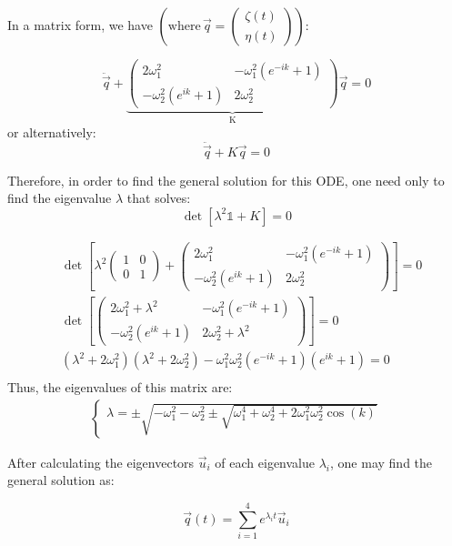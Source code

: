 \documentclass[
course = {{ITVO}},
quartile = {{1}},
assignment = 6,
name = {{Samir Salmen}},
studentnumber = {{NUSP: 11298636}},
email = {{samir.salmen@usp.br}},
firstexercise = 1
]{aga-homework}
\begin{document}
			In a matrix form, we have $\left(\text{where} \, \vec{q} = \begin{pmatrix}\zeta(t)\\\eta(t)\end{pmatrix}\right)$:
			
			\begin{equation}
				\ddot{\vec{q}} + \underbrace{\begin{pmatrix}2\omega_1^2 & -\omega_1^2(e^{-ik} + 1)\\ -\omega_2^2(e^{ik} + 1) & 2\omega_2^2\end{pmatrix}}_\text{K}\vec{q} = 0
			\end{equation}
			or alternatively:
			\begin{equation}
				\ddot{\vec{q}} + K\vec{q} = 0
			\end{equation}
			
			Therefore, in order to find the general solution for this ODE, one need only to find the eigenvalue $\lambda$ that solves:
			\begin{equation}
				\det[\lambda^2\mathds{1} + K] = 0
			\end{equation}
				
			\begin{align}
				&\det\left[\lambda^2 \begin{pmatrix}1 & 0\\ 0 & 1\end{pmatrix}+ \begin{pmatrix}2\omega_1^2 & -\omega_1^2(e^{-ik} + 1)\\ -\omega_2^2(e^{ik} + 1) & 2\omega_2^2\end{pmatrix} \right] = 0\\
				&\det\left[\begin{pmatrix}2\omega_1^2+ \lambda^2 & -\omega_1^2(e^{-ik} + 1)\\ -\omega_2^2(e^{ik} + 1) & 2\omega_2^2 + \lambda^2\end{pmatrix}\right] = 0\\
				&(\lambda^2+2\omega_1^2)	(\lambda^2+2\omega_2^2) - \omega_1^2\omega_2^2(e^{-ik}+1)(e^{ik}+1) = 0\\
			\end{align}
			Thus, the eigenvalues of this matrix are:
			\begin{align}
				\begin{cases}
					\lambda = \pm \sqrt{-\omega_1^2-\omega_2^2 \pm \sqrt{\omega_1^4+\omega_2^4 + 2\omega_1^2\omega_2^2\cos(k)}}
				\end{cases}
			\end{align}
		
			After calculating the eigenvectors $\vec{u}_i$ of each eigenvalue $\lambda_i$, one may find the general solution as:
			
			\begin{equation}
				\vec{q}(t) = \sum_{i=1}^{4}e^{\lambda_i t}\vec{u}_i
			\end{equation}
			
			
		
		
\end{document}
